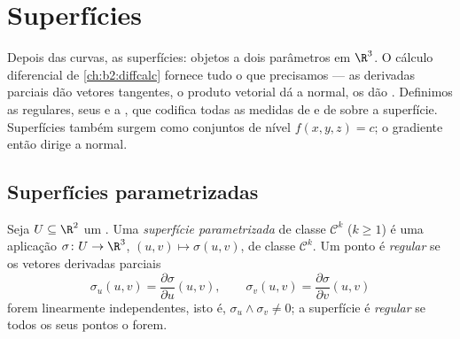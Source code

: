 \chapter{Superfícies}\label{ch:b2:surfaces}

Depois das curvas, as superfícies: objetos a dois parâmetros em $\R^3$. O
cálculo diferencial de \cref{ch:b2:diffcalc} fornece tudo o
que precisamos --- as derivadas parciais dão vetores tangentes, o produto
vetorial dá a normal, os  dão . Definimos as
 regulares, seus  e a
\emph{}, que codifica todas as medidas de
 e de  sobre a superfície. Superfícies também surgem como
conjuntos de nível $f(x, y, z) = c$; o gradiente então dirige a normal.

\section{Superfícies parametrizadas}

\begin{definition}\label{def:b2:surfaces:param}
Seja $U \subseteq \R^2$ um . Uma \emph{superfície
parametrizada} de
classe $\mathcal{C}^k$ ($k \geq 1$) é uma aplicação $\sigma \colon U \to
\R^3$, $(u, v) \mapsto \sigma(u, v)$, de classe $\mathcal{C}^k$. Um
ponto é \emph{regular} se os vetores derivadas parciais
\[
\sigma_u(u, v) = \frac{\partial\sigma}{\partial u}(u,v),
\qquad
\sigma_v(u, v) = \frac{\partial\sigma}{\partial v}(u,v)
\]
forem linearmente independentes, isto é, $\sigma_u \wedge \sigma_v \neq 0$;
a superfície é \emph{regular} se todos os seus pontos o forem.
\end{definition}

